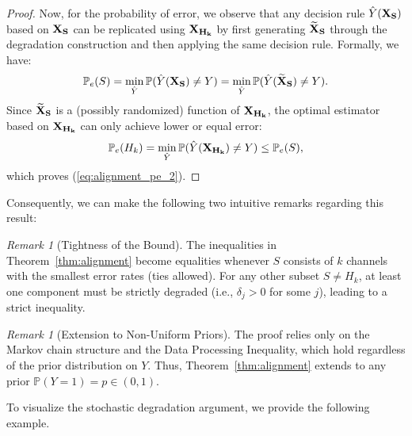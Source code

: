 \documentclass{article}
\theoremstyle{plain}
\theoremstyle{definition}
\theoremstyle{remark}
\newtheorem{remark}[theorem]{Remark}
\begin{document}
\begin{proof}
Now, for the probability of error, we observe that any decision rule $\hat{Y}({\bf X_S})$ based on ${\bf X_S}$ can be replicated using ${\bf X_{H_k}}$ by first generating ${\bf \widetilde{X}_S}$ through the degradation construction and then applying the same decision rule. Formally, we have:
\begin{equation}
    \mathbb{P}_e(S) = \min_{\hat{Y}} \mathbb{P}(\hat{Y}({\bf X_S}) \neq Y) = \min_{\hat{Y}} \mathbb{P}(\hat{Y}({\bf \widetilde{X}_S}) \neq Y).
\end{equation}
Since ${\bf \widetilde{X}_S}$ is a (possibly randomized) function of ${\bf X_{H_k}}$, the optimal estimator based on ${\bf X_{H_k}}$ can only achieve lower or equal error:
\begin{equation}
    \mathbb{P}_e(H_k) = \min_{\hat{Y}} \mathbb{P}(\hat{Y}({\bf X_{H_k}}) \neq Y) \le \mathbb{P}_e(S),
\end{equation}
which proves (\ref{eq:alignment_pe_2}).
\end{proof}
Consequently, we can make the following two intuitive remarks regarding this result:

\begin{remark}[Tightness of the Bound]
\label{rem:tightness}
The inequalities in Theorem~\ref{thm:alignment} become equalities whenever $S$ consists of $k$ channels with the smallest error rates (ties allowed).
 For any other subset $S \neq H_k$, at least one component must be strictly degraded (i.e., $\delta_j > 0$ for some $j$), leading to a strict inequality.
\end{remark}

\begin{remark}[Extension to Non-Uniform Priors]
\label{rem:extension}
The proof relies only on the Markov chain structure and the Data Processing Inequality, which hold regardless of the prior distribution on $Y$. Thus, Theorem~\ref{thm:alignment} extends to any prior $\mathbb{P}(Y=1) = p \in (0,1)$.
\end{remark}

To visualize the stochastic degradation argument, we provide the following example.
\end{document}
